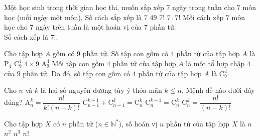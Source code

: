 \begin{ex}%
	Một học sinh trong thời gian học thi, muốn sắp xếp $7$ ngày trong tuần cho $7$ môn học (mỗi ngày một môn). Số cách sắp xếp là
	\choice
	{$7$}
	{$49$}
	{\True $7!$}
	{$7\cdot 7!$}
	\loigiai
	{
		Mỗi cách xếp $7$ môn học cho $7$ ngày trên tuần là một hoán vị của $7$ phần tử.\\
		Số cách xếp là $7!$.
	}
\end{ex}%
\begin{ex}%
 Cho tập hợp $A$ gồm có $9$ phần tử. Số tập con gồm có $4$ phần tử của tập hợp $A$ là
 \choice
  {$\mathrm{P}_4$}
  {\True $\mathrm{C}_9^4$}
  {$4\times 9$}
  {$\mathrm{A}_9^4$}
 \loigiai
  {
  Mỗi tập con gồm $4$ phần tử của tập hợp $A$ là một tổ hợp chập $4$ của $9$ phần tử. Do đó, số tập con gồm có $4$ phần tử của tập hợp $A$ là $\mathrm{C}_9^4$.
  }
\end{ex}%
\begin{ex}%
	Cho $n$ và $k$ là hai số nguyên dương tùy ý thỏa mãn $k\leq n$. Mệnh đề nào dưới đây đúng?
	\choice
	{$\mathrm{A}_n^k=\dfrac{n!}{k!(n-k)!}$}
	{\True $\mathrm{C}_{n-1}^{k-1}+\mathrm{C}_{n-1}^k=\mathrm{C}_n^k$}
	{$\mathrm{C}_n^{k-1}=\mathrm{C}_n^k$}
	{$\mathrm{C}_n^k=\dfrac{n!}{(n-k)!}$}
\end{ex}%
\begin{ex}%
	Cho tập hợp $ X $ có $ n $ phần tử ($n \in \mathbb{N}^* $), số hoán vị $ n $ phần tử của tập hợp $ X $ là
	\choice
	{$ n $}
	{$ n^2 $}
	{$ n^3 $}
	{\True $ n! $}
\end{ex}%
